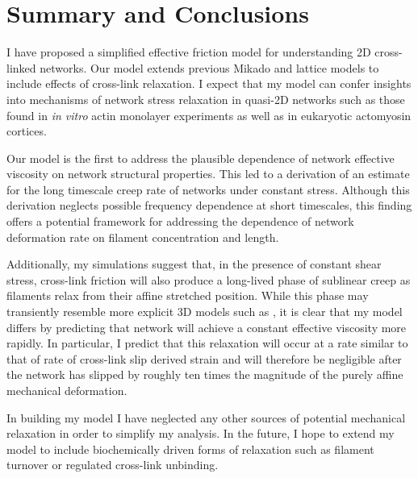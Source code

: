 \section{Summary and Conclusions}
I have proposed a simplified effective friction model for understanding 2D cross-linked networks. Our model extends previous Mikado and lattice models to include effects of cross-link relaxation. I expect that my model can confer insights into mechanisms of network stress relaxation in quasi-2D networks such as those found in \textit{in vitro} actin monolayer experiments\cite{rheo_2D1} as well as in eukaryotic actomyosin cortices\cite{cellmech_flows}.   

Our model is the first to address the plausible dependence of network effective viscosity on network structural properties.  This led to a derivation of an estimate for the long timescale creep rate of networks under constant stress.  Although this derivation neglects possible frequency dependence at short timescales, this finding offers a potential framework for addressing the dependence of network deformation rate on filament concentration and length.

Additionally, my simulations suggest that, in the presence of constant shear stress, cross-link friction will also produce a long-lived phase of sublinear creep as filaments relax from their affine stretched position. While this phase may transiently resemble more explicit 3D models such as \cite{theo_crosslinkslip1}, it is clear that my model differs by predicting that network will achieve a constant effective viscosity more rapidly.  In particular, I predict that this relaxation will occur at a rate similar to that of rate of cross-link slip derived strain and will therefore be negligible after the network has slipped by roughly ten times the magnitude of the purely affine mechanical deformation.  

In building my model I have neglected any other sources of potential mechanical relaxation in order to simplify my analysis. In the future, I hope to extend my model to include biochemically driven forms of relaxation such as filament turnover or regulated cross-link unbinding.

